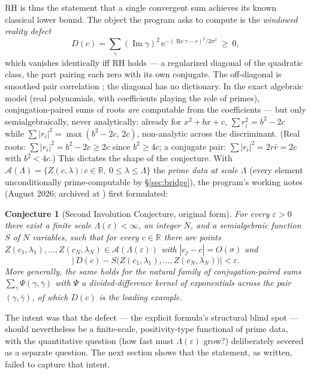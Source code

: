 \documentclass[11pt]{amsart}
\theoremstyle{plain}
\newtheorem{conjecture}[theorem]{Conjecture}
\theoremstyle{definition}
\theoremstyle{remark}
\newcommand{\RR}{\mathbb{R}}
\newcommand{\re}{\operatorname{Re}}
\newcommand{\im}{\operatorname{Im}}
\newcommand{\eE}{\mathrm{e}}
\begin{document}
RH is thus the statement that a single convergent sum achieves its known classical lower bound.
The object the program asks to compute is the \emph{windowed reality defect}
\begin{equation}\label{eq:defect}
D(c)=\sum_\gamma(\im\gamma)^2\,\eE^{-(\re\gamma-c)^2/2\sigma^2}\ \ge\ 0,
\end{equation}
which vanishes identically iff RH holds --- a regularized diagonal of the quadratic class, the
part pairing each zero with its own conjugate. The off-diagonal is smoothed pair correlation
\cite{Montgomery1973,GoldstonMontgomery1987}; the diagonal has no dictionary. In the exact
algebraic model (real polynomials, with coefficients playing the role of primes),
conjugation-paired sums of roots \emph{are} computable from the coefficients --- but only
semialgebraically, never analytically: already for $x^2+bx+c$,
$\sum r_i^2=b^2-2c$ while $\sum|r_i|^2=\max(b^2-2c,\,2c)$, non-analytic across the discriminant.
(Real roots: $\sum|r_i|^2=b^2-2c\ge2c$ since $b^2\ge4c$; a conjugate pair:
$\sum|r_i|^2=2r\bar r=2c$ with $b^2<4c$.) This dictates the shape of the conjecture. With
$\mathcal A(\Lambda)=\{Z(c,\lambda):c\in\RR,\ 0\le\lambda\le\Lambda\}$ the \emph{prime data at
scale $\Lambda$} (every element unconditionally prime-computable by \S\ref{sec:bridge}), the
program's working notes (August 2026; archived at \cite{ZenodoArchive}) first formulated:

\begin{conjecture}[Second Involution Conjecture, original form]\label{conj:original}
For every $\varepsilon>0$ there exist a finite scale $\Lambda(\varepsilon)<\infty$, an integer $N$,
and a semialgebraic function $S$ of $N$ variables, such that for every $c\in\RR$ there are points
$Z(c_1,\lambda_1),\dots,Z(c_N,\lambda_N)\in\mathcal A(\Lambda(\varepsilon))$ with
$|c_j-c|=O(\sigma)$ and
\[
\bigl|\,D(c)-S\bigl(Z(c_1,\lambda_1),\dots,Z(c_N,\lambda_N)\bigr)\bigr|<\varepsilon.
\]
More generally, the same holds for the natural family of conjugation-paired sums
$\sum_\gamma\Psi(\gamma,\bar\gamma)$ with $\Psi$ a divided-difference kernel of exponentials
across the pair $(\gamma,\bar\gamma)$, of which $D(c)$ is the leading example.
\end{conjecture}

The intent was that the defect --- the explicit formula's structural blind spot --- should
nevertheless be a finite-scale, positivity-type functional of prime data, with the quantitative
question (how fast must $\Lambda(\varepsilon)$ grow?) deliberately severed as a separate question.
The next section shows that the statement, as written, failed to capture that intent.
\end{document}
